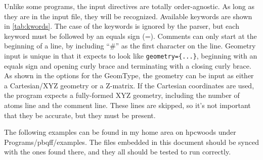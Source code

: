 \documentclass{article}
\begin{document}
Unlike some programs, the input directives are totally
order-agnostic. As long as they are in the input file, they will be
recognized. Available keywords are shown in \autoref{tab:kwords}.  The
case of the keywords is ignored by the parser, but each keyword must
be followed by an equals sign (=). Comments can only start at the
beginning of a line, by including ``\#'' as the first character on the
line. Geometry input is unique in that it expects to look like
\verb!geometry={...}!, beginning with an equals sign and opening curly
brace and terminating with a closing curly brace. As shown in the
options for the GeomType, the geometry can be input as either a
Cartesian/XYZ geometry or a Z-matrix. If the Cartesian coordinates are
used, the program expects a fully-formed XYZ geometry, including the
number of atoms line and the comment line. These lines are skipped, so
it's not important that they be accurate, but they must be present.

The following examples can be found in my home area on hpcwoods under
Programs/pbqff/examples. The files embedded in this document should be
synced with the ones found there, and they all should be tested to run
correctly. 
\end{document}
